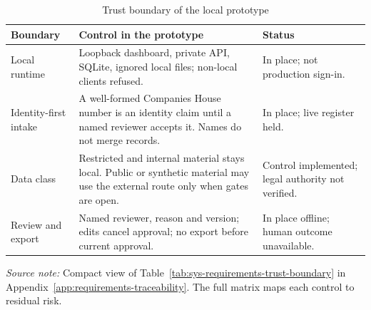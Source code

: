 \begin{table}[htbp]
  \centering
  \small
  \setlength{\tabcolsep}{3pt}
  \renewcommand{\arraystretch}{1.12}
  \begin{tabularx}{\textwidth}{@{}P{0.22\textwidth}P{0.38\textwidth}Y@{}}
    \toprule
    \textbf{Boundary} & \textbf{Control in the prototype} & \textbf{Status} \\
    \midrule
    Local runtime & Loopback dashboard, private API, SQLite, ignored local files; non-local clients refused. & In place; not production sign-in. \\
    Identity-first intake & A well-formed Companies House number is an identity claim until a named reviewer accepts it. Names do not merge records. & In place; live register held. \\
    Data class & Restricted and internal material stays local. Public or synthetic material may use the external route only when gates are open. & Control implemented; legal authority not verified. \\
    Review and export & Named reviewer, reason and version; edits cancel approval; no export before current approval. & In place offline; human outcome unavailable. \\
    \bottomrule
  \end{tabularx}
  \caption{Trust boundary of the local prototype}
  \label{tab:sys-requirements-compact}
  \vspace{3pt}
  \parbox{\textwidth}{\scriptsize
    \textit{Source note:} Compact view of Table~\ref{tab:sys-requirements-trust-boundary} in
    Appendix~\ref{app:requirements-traceability}. The full matrix maps each control to residual risk.}
\end{table}
